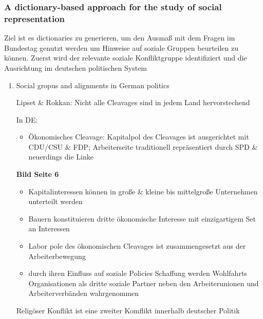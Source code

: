 \documentclass[11pt]{article}
\begin{document}
\subsubsection{A dictionary-based approach for the study of social representation}
\label{sec:org6fcbbcd}

Ziel ist es dictionaries zu generieren, um den Ausmaß mit dem Fragen im Bundestag genutzt werden um Hinweise auf soziale Gruppen beurteilen zu können. Zuerst wird der relevante soziale Konfliktgruppe identifiziert  und die Ausrichtung im deutschen politischen System 

\begin{enumerate}
\item Social gropus and alignments in German politics
\label{sec:org6290b1d}

Lipset \& Rokkan: Nicht alle Cleavages sind in jedem Land hervorstechend 

In DE: 

\begin{itemize}
\item Ökonomisches Cleavage: Kapitalpol des Cleavages ist ausgerichtet mit CDU/CSU \& FDP; Arbeiterseite traditionell repräsentiert durch SPD \& neuerdings die Linke
\end{itemize}

\textbf{\textbf{Bild Seite 6}}

\begin{itemize}
\item Kapitalinteressen können in große \& kleine bis mittelgroße Unternehmen unterteilt werden
\item Bauern konstituieren dritte ökonomische Interesse mit einzigartigem Set an Interessen
\item Labor pole des ökonomischen Cleavages ist zusammengesetzt aus der Arbeiterbewegung
\item durch ihren Einfluss auf soziale Policies Schaffung werden Wohlfahrts Organisationen als dritte soziale Partner neben den Arbeiterunionen und Arbeiterverbänden wahrgenommen
\end{itemize}

Religöser Konflikt ist eine zweiter Komflikt innerhalb deutscher Politik 


\end{enumerate}
\end{document}
